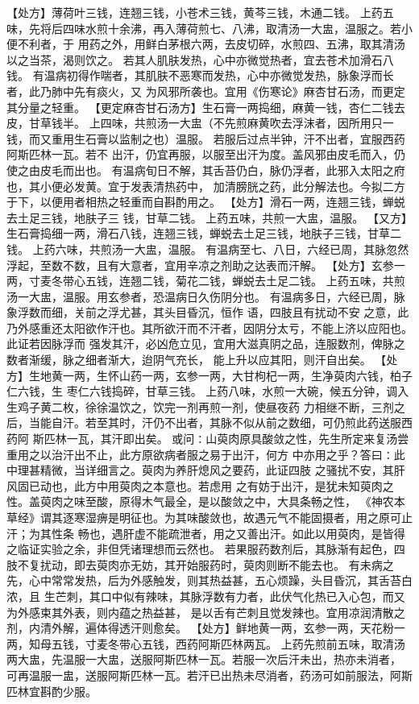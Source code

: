 \documentclass[a4paper,12pt,UTF8,twoside]{ctexbook}
\begin{document}
【处方】薄荷叶三钱，连翘三钱，小苍术三钱，黄芩三钱，木通二钱。 
上药五味，先将后四味水煎十余沸，再入薄荷煎七、八沸，取清汤一大盅，温服之。若小便不利者，于 
用药之外，用鲜白茅根六两，去皮切碎，水煎四、五沸，取其清汤以之当茶，渴则饮之。 
若其人肌肤发热，心中亦微觉热者，宜去苍术加滑石八钱。 
有温病初得作喘者，其肌肤不恶寒而发热，心中亦微觉发热，脉象浮而长者，此乃肺中先有痰火，又 
为风邪所袭也。宜用《伤寒论》麻杏甘石汤，而更定其分量之轻重。 
【更定麻杏甘石汤方】生石膏一两捣细，麻黄一钱，杏仁二钱去皮，甘草钱半。 
上四味，共煎汤一大盅（不先煎麻黄吹去浮沫者，因所用只一钱，而又重用生石膏以监制之也）温服。 
若服后过点半钟，汗不出者，宜服西药阿斯匹林一瓦。若不 
出汗，仍宜再服，以服至出汗为度。盖风邪由皮毛而入，仍使之由皮毛而出也。 
有温病旬日不解，其舌苔仍白，脉仍浮者，此邪入太阳之府也，其小便必发黄。宜于发表清热药中， 
加清膀胱之药，此分解法也。今拟二方于下，以便用者相热之轻重而自斟酌用之。 
【处方】滑石一两，连翘三钱，蝉蜕去土足三钱，地肤子三 
钱，甘草二钱。 
上药五味，共煎一大盅，温服。 
【又方】生石膏捣细一两，滑石八钱，连翘三钱，蝉蜕去土足三钱，地肤子三钱，甘草二钱。 
上药六味，共煎汤一大盅，温服。 
有温病至七、八日，六经已周，其脉忽然浮起，至数不数，且有大意者，宜用辛凉之剂助之达表而汗解。 
【处方】玄参一两，寸麦冬带心五钱，连翘二钱，菊花二钱，蝉蜕去土足二钱。 
上药五味，共煎汤一大盅，温服。用玄参者，恐温病日久伤阴分也。 
有温病多日，六经已周，脉象浮数而细，关前之浮尤甚，其头目昏沉，恒作 语，四肢且有扰动不安 
之意，此乃外感重还太阳欲作汗也。其所欲汗而不汗者，因阴分太亏，不能上济以应阳也。此证若因脉浮而 
强发其汗，必凶危立见，宜用大滋真阴之品，连服数剂，俾脉之数者渐缓，脉之细者渐大，迨阴气充长， 
能上升以应其阳，则汗自出矣。 
【处方】生地黄一两，生怀山药一两，玄参一两，大甘枸杞一两，生净萸肉六钱，柏子仁六钱，生 
枣仁六钱捣碎，甘草三钱。 
上药八味，水煎一大碗，候五分钟，调入生鸡子黄二枚，徐徐温饮之，饮完一剂再煎一剂，使昼夜药 
力相继不断，三剂之后，当能自汗。若至其时，汗仍不出者，其脉不似从前之数细，可仍煎此药送服西药阿 
斯匹林一瓦，其汗即出矣。 
或问∶山萸肉原具酸敛之性，先生所定来复汤尝重用之以治汗出不止，此方原欲病者服之易于出汗，何方 
中亦用之乎？答曰∶此中理甚精微，当详细言之。萸肉为养肝熄风之要药，此证四肢 
之骚扰不安，其肝风固已动也，此方中用萸肉之本意也。若虑用 
之有妨于出汗，是犹未知萸肉之性。盖萸肉之味至酸，原得木气最全，是以酸敛之中，大具条畅之性， 
《神农本草经》谓其逐寒湿痹是明征也。为其味酸敛也，故遇元气不能固摄者，用之原可止汗；为其性条 
畅也，遇肝虚不能疏泄者，用之又善出汗。如此以用萸肉，是皆得之临证实验之余，非但凭诸理想而云然也。 
若果服药数剂后，其脉渐有起色，四肢不复扰动，即去萸肉亦无妨，其开始服药时，萸肉则断不能去也。 
有未病之先，心中常常发热，后为外感触发，则其热益甚，五心烦躁，头目昏沉，其舌苔白浓，且 
生芒刺，其口中似有辣味，其脉浮数有力者，此伏气化热已入心包，而又为外感束其外表，则内蕴之热益甚， 
是以舌有芒刺且觉发辣也。宜用凉润清散之剂，内清外解，遍体得透汗则愈矣。 
【处方】鲜地黄一两，玄参一两，天花粉一两，知母五钱，寸麦冬带心五钱，西药阿斯匹林两瓦。 
上药先煎前五味，取清汤两大盅，先温服一大盅，送服阿斯匹林一瓦。若服一次后汗未出，热亦未消者， 
可再温服一盅，送服阿斯匹林一瓦。若汗已出热未尽消者，药汤可如前服法，阿斯匹林宜斟酌少服。 
\end{document}
